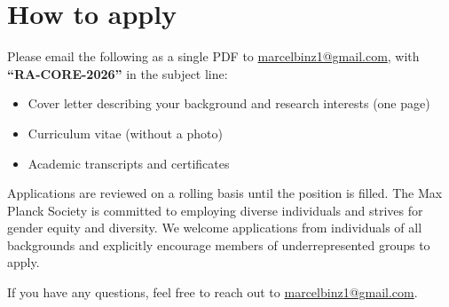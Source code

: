 \section*{How to apply}
\begin{callout}
Please email the following as a single PDF to
\href{mailto:marcelbinz1@gmail.com}{marcelbinz1@gmail.com},
with \textbf{“RA-CORE-2026”} in the subject line:
\begin{itemize}
  \item Cover letter describing your background and research interests (one page)
  \item Curriculum vitae (without a photo)
  \item Academic transcripts and certificates
\end{itemize}

\vspace{5pt}
Applications are reviewed on a rolling basis until the
position is filled. The Max Planck Society is committed to employing diverse
individuals and strives for gender equity and diversity. We welcome applications
from individuals of all backgrounds and explicitly encourage members of
underrepresented groups to apply.

\vspace{5pt}
{\color{inksoft}If you have any questions, feel free to reach out to
\href{mailto:marcelbinz1@gmail.com}{marcelbinz1@gmail.com}.}
\end{callout}


